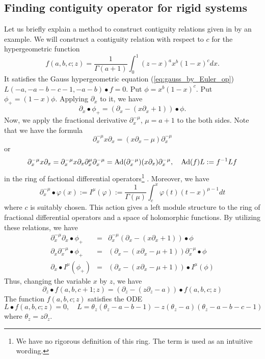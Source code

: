 \documentclass{article}
\def\pd#1{\partial_{#1}}
\begin{document}

\subsection{Finding contiguity operator for rigid systems} \label{sec:oshima-rigid}
Let us briefly explain a method to construct contiguity relations
given in \cite[Sec 3.2, Chap 11]{oshima-2012} by an example.
We will construct a contiguity relation with respect to $c$ 
for the hypergeometric function
$$
   f(a,b,c;z)=\frac{1}{\Gamma(a+1)} \int_0^1 (z-x)^a x^b (1-x)^c dx.
$$
It satisfies the Gauss hypergeometric equation
(\ref{eq:gauss_by_Euler_op})
$L(-a,-a-b-c-1,-a-b) \bullet f = 0$.
Put
$\phi = x^b (1-x)^c $.
Put $\phi_+=(1-x) \phi$.
Applying $\pd{x}$ to it, we have
$$ \pd{x} \bullet \phi_+ = (\pd{x} -(x \pd{x}+1))\bullet \phi. $$
Now, we apply the fractional derivative
$\pd{x}^{-\mu}$, $\mu=a+1$ to the both sides.
Note that we have the formula
$$ \pd{x}^{-\mu} x \pd{x} = (x \pd{x}-\mu) \pd{x}^{-\mu} $$
or 
$$ \pd{x}^{-\mu} x \pd{x} = \pd{x}^{-\mu} x \pd{x} \pd{x}^\mu \pd{x}^{-\mu} 
  = {\rm Ad}(\pd{x}^{-\mu}) (x \pd{x}) \pd{x}^{-\mu}, \quad
   {\rm Ad}(f)L := f^{-1} L f
$$
in the ring of factional differential operators\footnote{We have no rigorous definition of this ring. The term is used as an intuitive wording.} \cite[Secs 1.2, 1.3]{oshima-2012}.
Moreover, we have
$$
   \pd{x}^{-\mu} \bullet \varphi(x) := I^\mu(\varphi):=\frac{1}{\Gamma(\mu)}\int_c^x \varphi(t) (t-x)^{\mu-1} dt
$$
where $c$ is suitably chosen.
This action gives a left module structure to the ring of fractional 
differential operators and a space of holomorphic functions.
By utilizing these relations, we have
\begin{eqnarray}
 \pd{x}^{-\mu} \pd{x} \bullet \phi_+ &=& \pd{x}^{-\mu} (\pd{x} -(x \pd{x}+1))\bullet \phi \\
 \pd{x} \pd{x}^{-\mu} \bullet \phi_+ &=& (\pd{x} -(x \pd{x}-\mu+1))\pd{x}^{-\mu}  \bullet \phi \\
 \pd{x} \bullet I^{\mu}(\phi_+) &=& (\pd{x} -(x \pd{x}-\mu+1)) \bullet I^\mu(\phi) 
\end{eqnarray}
Thus, changing the variable $x$ by $z$, we have
\begin{equation}  \label{eq:conti0}
  \pd{z} \bullet f(a,b,c+1;z) = (\pd{z}-(z \pd{z} - a)) \bullet f(a,b,c;z)
\end{equation}
The function $f(a,b,c;z)$ satisfies the ODE
\begin{equation}
  L \bullet f(a,b,c;z)=0, \quad
  L=\theta_z (\theta_z-a-b-1)-z (\theta_z-a)(\theta_z-a-b-c-1)
\end{equation}
where $\theta_z = z \pd{z}$.
\end{document}
